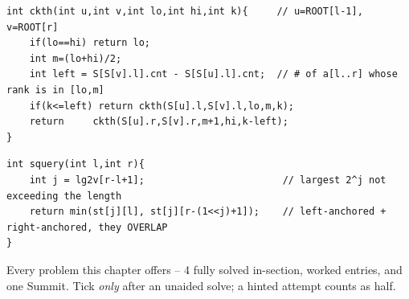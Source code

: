 \begin{lstlisting}[caption={Drill 4 -- chairman k-th: the two-root left-count difference decides each fork (from lst:c19-kth)}]
int ckth(int u,int v,int lo,int hi,int k){     // u=ROOT[l-1], v=ROOT[r]
    if(lo==hi) return lo;
    int m=(lo+hi)/2;
    int left = S[S[v].l].cnt - S[S[u].l].cnt;  // # of a[l..r] whose rank is in [lo,m]
    if(k<=left) return ckth(S[u].l,S[v].l,lo,m,k);
    return     ckth(S[u].r,S[v].r,m+1,hi,k-left);
}
\end{lstlisting}

\begin{lstlisting}[caption={Drill 5 -- sparse table O(1) query: two overlapping blocks (from lst:c19-sparse)}]
int squery(int l,int r){
    int j = lg2v[r-l+1];                        // largest 2^j not exceeding the length
    return min(st[j][l], st[j][r-(1<<j)+1]);    // left-anchored + right-anchored, they OVERLAP
}
\end{lstlisting}


Every problem this chapter offers -- 4 fully solved in-section, worked entries, and one
Summit. Tick \emph{only} after an unaided solve; a hinted attempt counts as half.

